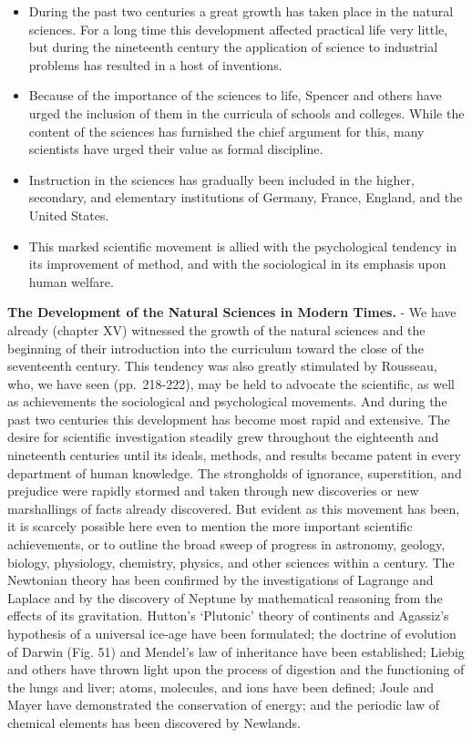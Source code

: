 \documentclass[
]{book}
\providecommand{\tightlist}{%
  \setlength{\itemsep}{0pt}\setlength{\parskip}{0pt}}
\begin{document}
\begin{itemize}
\tightlist
\item
  During the past two centuries a great growth has taken place in the natural sciences. For a long time this development affected practical life very little, but during the nineteenth century the application of science to industrial problems has resulted in a host of inventions.
\item
  Because of the importance of the sciences to life, Spencer and others have urged the inclusion of them in the curricula of schools and colleges. While the content of the sciences has furnished the chief argument for this, many scientists have urged their value as formal discipline.
\item
  Instruction in the sciences has gradually been included in the higher, secondary, and elementary institutions of Germany, France, England, and the United States.
\item
  This marked scientific movement is allied with the psychological tendency in its improvement of method, and with the sociological in its emphasis upon human welfare.
\end{itemize}

\textbf{The Development of the Natural Sciences in Modern Times.} - We have already (chapter XV) witnessed the growth of the natural sciences and the beginning of their introduction into the curriculum toward the close of the seventeenth century. This tendency was also greatly stimulated by Rousseau, who, we have seen (pp.~218-222), may be held to advocate the scientific, as well as achievements the sociological and psychological movements. And during the past two centuries this development has become most rapid and extensive. The desire for scientific investigation steadily grew throughout the eighteenth and nineteenth centuries until its ideals, methods, and results became patent in every department of human knowledge. The strongholds of ignorance, superstition, and prejudice were rapidly stormed and taken through new discoveries or new marshallings of facts already discovered. But evident as this movement has been, it is scarcely possible here even to mention the more important scientific achievements, or to outline the broad sweep of progress in astronomy, geology, biology, physiology, chemistry, physics, and other sciences within a century. The Newtonian theory has been confirmed by the investigations of Lagrange and Laplace and by the discovery of Neptune by mathematical reasoning from the effects of its gravitation. Hutton's `Plutonic' theory of continents and Agassiz's hypothesis of a universal ice-age have been formulated; the doctrine of evolution of Darwin (Fig. 51) and Mendel's law of inheritance have been established; Liebig and others have thrown light upon the process of digestion and the functioning of the lungs and liver; atoms, molecules, and ions have been defined; Joule and Mayer have demonstrated the conservation of energy; and the periodic law of chemical elements has been discovered by Newlands.
\end{document}

